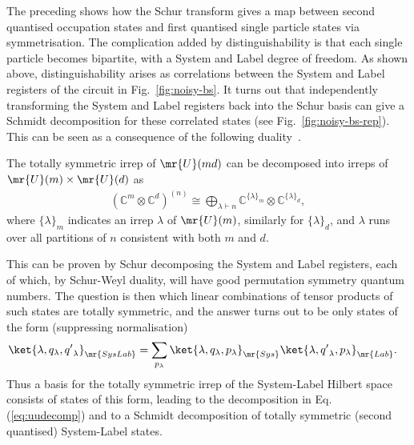The preceding shows how the Schur transform gives a map between second quantised occupation states and first quantised single particle states via symmetrisation.
The complication added by distinguishability is that each single particle becomes bipartite, with a System and Label degree of freedom.
As shown above, distinguishability arises as correlations between the System and Label registers of the circuit in Fig.~\ref{fig:noisy-bs}.
It turns out that independently transforming the System and Label registers back into the Schur basis can give a Schmidt decomposition for these correlated states (see Fig.~\ref{fig:noisy-bs-rep}).
This can be seen as a consequence of the following duality~\cite{goodman2009, rowe2012}.
\begin{theorem}\label{thm:unitary-unitary}
The totally symmetric irrep of $\mr{U}(md)$ can be decomposed into irreps of $\mr{U}(m) \times \mr{U}(d)$ as
\begin{align}\label{eq:uudecomp}
(\mathbb{C}^{m} \otimes \mathbb{C}^{d})^{(n)} \cong \bigoplus_{\lambda\vdash n} \mathbb{C}^{\{\lambda\}_m} \otimes \mathbb{C}^{\{\lambda\}_d} ,
\end{align}
where $\{\lambda\}_m$ indicates an irrep $\lambda$ of $\mr{U}(m)$, similarly for $\{\lambda\}_d$, and $\lambda$ runs over all partitions of $n$ consistent with both $m$ and $d$.
\end{theorem}
This can be proven by Schur decomposing the System and Label registers, each of which, by Schur-Weyl duality, will have good permutation symmetry quantum numbers.
The question is then which linear combinations of tensor products of such states are totally symmetric, and the answer turns out to be only states of the form (suppressing normalisation)~\cite{hamermesh1962}
\begin{align}\label{eq:symSL}
\ket{\lambda, q_\lambda, {q'}_\lambda}_\mr{SysLab} &=  \sum_{p_\lambda} \ket{\lambda, q_\lambda, p_\lambda}_\mr{Sys} \ket{\lambda, {q'}_\lambda, p_\lambda}_\mr{Lab} .
\end{align}
Thus a basis for the totally symmetric irrep of the System-Label Hilbert space consists of states of this form, leading to the decomposition in Eq.(\ref{eq:uudecomp}) and to a Schmidt decomposition of totally symmetric (second quantised) System-Label states.

